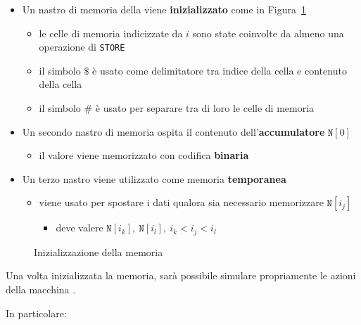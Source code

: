 \documentclass[italian, 10pt]{article}
\begin{document}
\begin{itemize}
  \item Un nastro di memoria della \TM viene \textbf{inizializzato} come in Figura~\ref{fig:inizializzazione-memoria-ram}
        \begin{itemize}
          \item le celle di memoria indicizzate da \(i\) sono state coinvolte da almeno una operazione di \texttt{STORE}
          \item il simbolo \(\$\) è usato come delimitatore tra indice della cella e contenuto della cella
          \item il simbolo \(\#\) è usato per separare tra di loro le celle di memoria
        \end{itemize}
  \item Un secondo nastro di memoria ospita il contenuto dell'\textbf{accumulatore} \(\texttt{N}[0]\)
        \begin{itemize}
          \item il valore viene memorizzato con codifica \textbf{binaria}
        \end{itemize}
  \item Un terzo nastro viene utilizzato come memoria \textbf{temporanea}
        \begin{itemize}
          \item viene usato per spostare i dati qualora sia necessario memorizzare \(\texttt{N}[i_j]\)
                \begin{itemize}
                  \item deve valere \(\texttt{N}[i_k],\ \texttt{N}[i_l],\ i_k < i_j < i_l\)
                \end{itemize}
        \end{itemize}
\end{itemize}

\begin{figure}
  \bigskip
  \centering
  \caption{Inizializzazione della memoria \RAM}
  \label{fig:inizializzazione-memoria-ram}
  \bigskip
\end{figure}

Una volta inizializzata la memoria, sarà possibile simulare propriamente le azioni della macchina \RAM.

In particolare:
\end{document}
